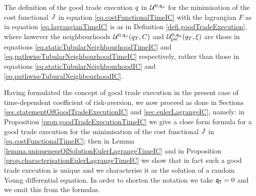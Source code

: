 \documentclass[10pt,a4paper]{article}
\begin{document}
The definition of the good trade execution $q$ in $\mathcal{U}^{0,\mathfrak{q_0}}$ for the minimisation of the cost functional $J$ in equation \eqref{eq.costFunctionalTimeIC} with the lagrangian $F$ as in equation \eqref{eq.lagrangianTimeIC} is as in Definition \ref{defi.goodTradeExecution}, where however the neighbourhoods $\mathcal{U}^{0,\mathfrak{q_0}} (q_T, C)$ and $\mathcal{U}^{0,\mathfrak{q_0}}_{\text{pw}}(q_T,\xi)$ are those in equations \eqref{eq.staticTubularNeighbourhoodTimeIC} and \eqref{eq.pathwiseTubularNeighbourhoodTimeIC} respectively, rather than those in equations \eqref{eq.staticTubularNeighbourhoodIC} and \eqref{eq.pathwiseTuburalNeighbourhoodIC}.

Having formulated the concept of good trade execution in the present case of time-dependent coefficient of risk-aversion, we now proceed as done in Sections \ref{sec.statementOfGoodTradeExecutionIC} and \ref{sec.eulerLagrangeIC}, namely: in Proposition \ref{prop.goodTradeExecutionTimeIC} we give a close form formula for a good trade execution for the minimisation of the cost functional $J$ in \eqref{eq.costFunctionalTimeIC}; then in Lemma \ref{lemma.uniquenessOfSolutionEulerLagrangeTimeIC} and in Proposition \ref{prop.characterisationEulerLagrangeTimeIC} we show that in fact such a good trade execution is unique and we characterise it as the solution of a random Young differential equation. In order to shorten the notation we take $\mathfrak{q}_{\mathtt{T} } = 0$ and we omit this from the formulas. 
\end{document}

